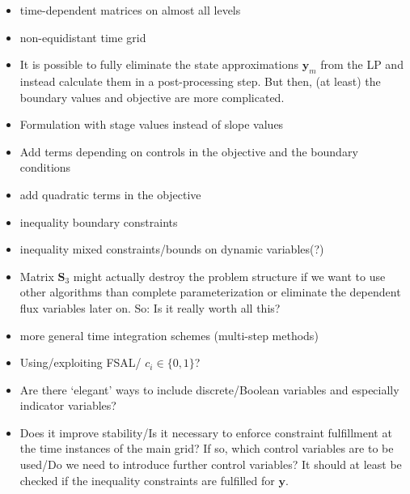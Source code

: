 \documentclass{article}
\newcommand{\vectorfont}[1]{\boldsymbol{#1}}%
\newcommand{\matrixfont}[1]{\mathbf{#1}}%
\newcommand{\yvec}{\vectorfont{y}}
\newcommand{\Smat}{\matrixfont{S}}
\begin{document}
\begin{itemize}
  \item time-dependent matrices on almost all levels
	\item non-equidistant time grid
	\item It is possible to fully eliminate the state approximations $\yvec_{m}$ from the LP and instead calculate them in a post-processing step.
	But then, (at least) the boundary values and objective are more complicated.
	\item Formulation with stage values instead of slope values
	\item Add terms depending on controls in the objective and the boundary conditions
	\item add quadratic terms in the objective
	\item inequality boundary constraints
	\item inequality mixed constraints/bounds on dynamic variables(?)
	\item Matrix $\Smat_3$ might actually destroy the problem structure if we want to use other algorithms than complete parameterization or eliminate the dependent flux variables later on. So: Is it really worth all this?
	\item more general time integration schemes (multi-step methods)
	\item Using/exploiting FSAL/ $c_i \in \lbrace 0,1\rbrace$?
	\item Are there `elegant' ways to include discrete/Boolean variables and especially indicator variables?
	\item Does it improve stability/Is it necessary to enforce constraint fulfillment at the time instances of the main grid? If so, which control variables are to be used/Do we need to introduce further control variables?
	It should at least be checked if the inequality constraints are fulfilled for $\yvec$.
\end{itemize}
\end{document}
